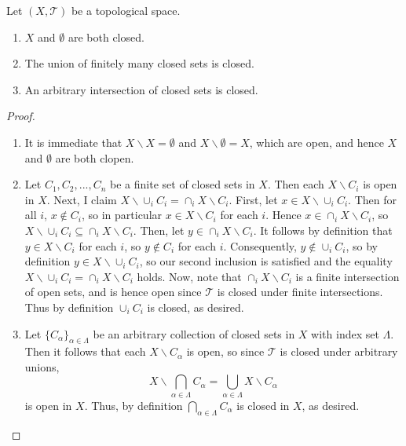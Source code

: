 \documentclass[12pt, a4paper, oneside, openright, titlepage]{book}
\begin{document}
\begin{proposition}
    Let $(X,\mathcal{T})$ be a topological space.\begin{enumerate}
        \item $X$ and $\emptyset$ are both closed.
        \item The union of finitely many closed sets is closed.
        \item An arbitrary intersection of closed sets is closed.
    \end{enumerate}
\end{proposition}
\begin{proof}
    \leavevmode
    \begin{enumerate}
        \item It is immediate that $X\backslash X = \emptyset$ and $X\backslash \emptyset = X$, which are open, and hence $X$ and $\emptyset$ are both clopen.
        \item Let $C_1,C_2,...,C_n$ be a finite set of closed sets in $X$. Then each $X\backslash C_i$ is open in $X$. Next, I claim $X\backslash \cup_iC_i = \cap_iX\backslash C_i$. First, let $x \in X\backslash \cup_iC_i$. Then for all $i$, $x \notin C_i$, so in particular $x \in X\backslash C_i$ for each $i$. Hence $x \in \cap_iX\backslash C_i$, so $X\backslash \cup_iC_i \subseteq \cap_iX\backslash C_i$. Then, let $y \in \cap_iX\backslash C_i$. It follows by definition that $y \in X\backslash C_i$ for each $i$, so $y \notin C_i$ for each $i$. Consequently, $y \notin \cup_iC_i$, so by definition $y \in X\backslash \cup_iC_i$, so our second inclusion is satisfied and the equality $X\backslash \cup_iC_i = \cap_iX\backslash C_i$ holds. Now, note that $\cap_iX\backslash C_i$ is a finite intersection of open sets, and is hence open since $\mathcal{T}$ is closed under finite intersections. Thus by definition $\cup_iC_i$ is closed, as desired.
        \item Let $\{C_{\alpha}\}_{\alpha \in \Lambda}$ be an arbitrary collection of closed sets in $X$ with index set $\Lambda$. Then it follows that each $X\backslash C_{\alpha}$ is open, so since $\mathcal{T}$ is closed under arbitrary unions, \begin{equation*}
                X\backslash\bigcap_{\alpha \in \Lambda}C_{\alpha} = \bigcup_{\alpha\in\Lambda}X\backslash C_{\alpha}
        \end{equation*}
            is open in $X$. Thus, by definition $\bigcap_{\alpha\in\Lambda}C_{\alpha}$ is closed in $X$, as desired.
    \end{enumerate}
\end{proof}
\end{document}
